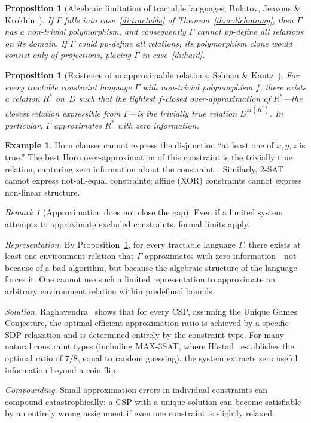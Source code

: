 \documentclass[11pt,a4paper]{article}
\theoremstyle{plain}
\newtheorem{proposition}[theorem]{Proposition}
\theoremstyle{definition}
\newtheorem{example}[theorem]{Example}
\theoremstyle{remark}
\newtheorem{remark}[theorem]{Remark}
\begin{document}
\begin{proposition}[Algebraic limitation of tractable languages; Bulatov, Jeavons \& Krokhin~\cite{BJK05}]\label{prop:algebra}
If $\Gamma$ falls into case~\ref{di:tractable} of Theorem~\ref{thm:dichotomy}, then $\Gamma$ has a non-trivial polymorphism, and consequently $\Gamma$ cannot pp-define all relations on its domain.
If $\Gamma$ could pp-define all relations, its polymorphism clone would consist only of projections, placing $\Gamma$ in case~\ref{di:hard}.
\end{proposition}

\begin{proposition}[Existence of unapproximable relations; Selman \& Kautz~\cite{SelmanKautz96}]\label{prop:unapprox-rep}
For every tractable constraint language $\Gamma$ with non-trivial polymorphism $f$, there exists a relation $R^*$ on~$D$ such that the tightest $f$-closed over-approximation of $R^*$---the closest relation expressible from $\Gamma$---is the trivially true relation $D^{\mathrm{ar}(R^*)}$.
In particular, $\Gamma$ approximates $R^*$ with zero information.
\end{proposition}

\begin{example}\label{ex:horn}
Horn clauses cannot express the disjunction ``at least one of $x, y, z$ is true.''
The best Horn over-approximation of this constraint is the trivially true relation, capturing zero information about the constraint~\cite{SelmanKautz96}.
Similarly, 2-SAT cannot express not-all-equal constraints; affine (XOR) constraints cannot express non-linear structure.
\end{example}

\begin{remark}[Approximation does not close the gap]\label{rem:approx-gap}
Even if a limited system attempts to approximate excluded constraints, formal limits apply.

\emph{Representation.}
By Proposition~\ref{prop:unapprox-rep}, for every tractable language $\Gamma$, there exists at least one environment relation that $\Gamma$ approximates with zero information---not because of a bad algorithm, but because the algebraic structure of the language forces it.
One cannot use such a limited representation to approximate an arbitrary environment relation within predefined bounds.

\emph{Solution.}
Raghavendra~\cite{Raghavendra08} shows that for every CSP, assuming the Unique Games Conjecture, the optimal efficient approximation ratio is achieved by a specific SDP relaxation and is determined entirely by the constraint type.
For many natural constraint types (including MAX-3SAT, where H\aa stad~\cite{Hastad01} establishes the optimal ratio of $7/8$, equal to random guessing), the system extracts zero useful information beyond a coin flip.

\emph{Compounding.}
Small approximation errors in individual constraints can compound catastrophically: a CSP with a unique solution can become satisfiable by an entirely wrong assignment if even one constraint is slightly relaxed.
\end{remark}
\end{document}
